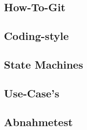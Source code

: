 \documentclass[
   draft=false
  ,paper=a4
  ,twoside=true
  ,fontsize=11pt
  ,headsepline
  ,DIV11
  ,parskip=full+
]{scrartcl} %
\begin{document}
\subsection{How-To-Git}

\subsection{Coding-style}

%
\subsection{State Machines}

\subsection{Use-Case's}

\subsection{Abnahmetest }

\end{document}
